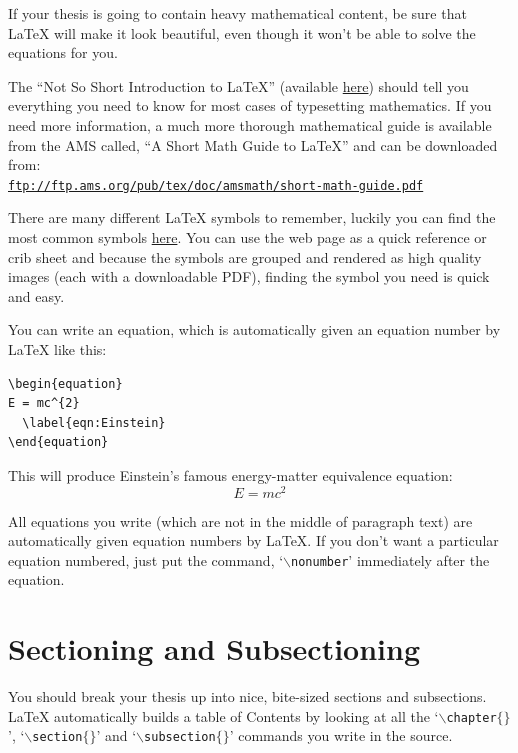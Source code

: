 If your thesis is going to contain heavy mathematical content, be sure that \LaTeX{} will make it look beautiful, even though it won't be able to solve the equations for you.

The ``Not So Short Introduction to \LaTeX{}'' (available \href{http://www.ctan.org/tex-archive/info/lshort/english/lshort.pdf}{here}) should tell you everything you need to know for most cases of typesetting mathematics. If you need more information, a much more thorough mathematical guide is available from the AMS called, ``A Short Math Guide to \LaTeX{}'' and can be downloaded from:\\
\href{ftp://ftp.ams.org/pub/tex/doc/amsmath/short-math-guide.pdf}{\texttt{ftp://ftp.ams.org/pub/tex/doc/amsmath/short-math-guide.pdf}}

There are many different \LaTeX{} symbols to remember, luckily you can find the most common symbols \href{http://www.sunilpatel.co.uk/latexsymbols.html}{here}. You can use the web page as a quick reference or crib sheet and because the symbols are grouped and rendered as high quality images (each with a downloadable PDF), finding the symbol you need is quick and easy.

You can write an equation, which is automatically given an equation number by \LaTeX{} like this:
\begin{verbatim}
\begin{equation}
E = mc^{2}
  \label{eqn:Einstein}
\end{equation}
\end{verbatim}

This will produce Einstein's famous energy-matter equivalence equation:
\begin{equation}
E = mc^{2}
\label{eqn:Einstein}
\end{equation}

All equations you write (which are not in the middle of paragraph text) are automatically given equation numbers by \LaTeX{}. If you don't want a particular equation numbered, just put the command, `$\backslash$\texttt{nonumber}' immediately after the equation.


\section{Sectioning and Subsectioning}

You should break your thesis up into nice, bite-sized sections and subsections. \LaTeX{} automatically builds a table of Contents by looking at all the `$\backslash$\texttt{chapter}$\{\}$', `$\backslash$\texttt{section}$\{\}$' and `$\backslash$\texttt{subsection}$\{\}$' commands you write in the source.

